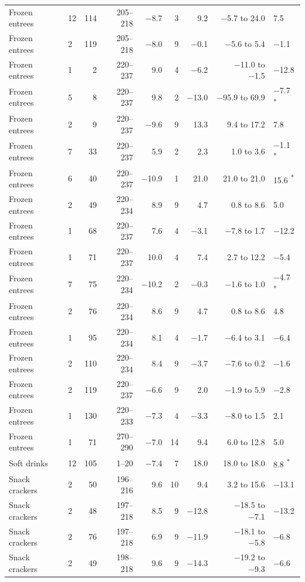 \begin{tabular}{@{}llrrrrrrl@{}}
Frozen entrees & 12 & 114 & 205--218 & −8.7 & 3 & 9.2 & −5.7 to 24.0 & 7.5 \\
Frozen entrees & 2 & 119 & 205--218 & −8.0 & 9 & −0.1 & −5.6 to 5.4 & −1.1 \\
Frozen entrees & 1 & 2 & 220--237 & 9.0 & 4 & −6.2 & −11.0 to −1.5 & −12.8 \\
Frozen entrees & 5 & 8 & 220--237 & 9.8 & 2 & −13.0 & −95.9 to 69.9 & −7.7 \textsuperscript{*} \\
Frozen entrees & 2 & 9 & 220--237 & −9.6 & 9 & 13.3 & 9.4 to 17.2 & 7.8 \\
Frozen entrees & 7 & 33 & 220--237 & 5.9 & 2 & 2.3 & 1.0 to 3.6 & −1.1 \textsuperscript{*} \\
Frozen entrees & 6 & 40 & 220--237 & −10.9 & 1 & 21.0 & 21.0 to 21.0 & 15.6 \textsuperscript{*} \\
Frozen entrees & 2 & 49 & 220--234 & 8.9 & 9 & 4.7 & 0.8 to 8.6 & 5.0 \\
Frozen entrees & 1 & 68 & 220--237 & 7.6 & 4 & −3.1 & −7.8 to 1.7 & −12.2 \\
Frozen entrees & 1 & 71 & 220--237 & 10.0 & 4 & 7.4 & 2.7 to 12.2 & −5.4 \\
Frozen entrees & 7 & 75 & 220--234 & −10.2 & 2 & −0.3 & −1.6 to 1.0 & −4.7 \textsuperscript{*} \\
Frozen entrees & 2 & 76 & 220--234 & 8.6 & 9 & 4.7 & 0.8 to 8.6 & 4.8 \\
Frozen entrees & 1 & 95 & 220--234 & 8.1 & 4 & −1.7 & −6.4 to 3.1 & −6.4 \\
Frozen entrees & 2 & 110 & 220--234 & 8.4 & 9 & −3.7 & −7.6 to 0.2 & −1.6 \\
Frozen entrees & 2 & 119 & 220--237 & −6.6 & 9 & 2.0 & −1.9 to 5.9 & −2.8 \\
Frozen entrees & 1 & 130 & 220--233 & −7.3 & 4 & −3.3 & −8.0 to 1.5 & 2.1 \\
Frozen entrees & 1 & 71 & 270--290 & −7.0 & 14 & 9.4 & 6.0 to 12.8 & 5.0 \\
Soft drinks & 12 & 105 & 1--20 & −7.4 & 7 & 18.0 & 18.0 to 18.0 & 8.8 \textsuperscript{*} \\
Snack crackers & 2 & 50 & 196--216 & 9.6 & 10 & 9.4 & 3.2 to 15.6 & −13.1 \\
Snack crackers & 2 & 48 & 197--218 & 8.5 & 9 & −12.8 & −18.5 to −7.1 & −13.2 \\
Snack crackers & 2 & 76 & 197--218 & 6.9 & 9 & −11.9 & −18.1 to −5.8 & −6.8 \\
Snack crackers & 2 & 49 & 198--218 & 9.6 & 9 & −14.3 & −19.2 to −9.3 & −6.6 \\

\end{tabular}
